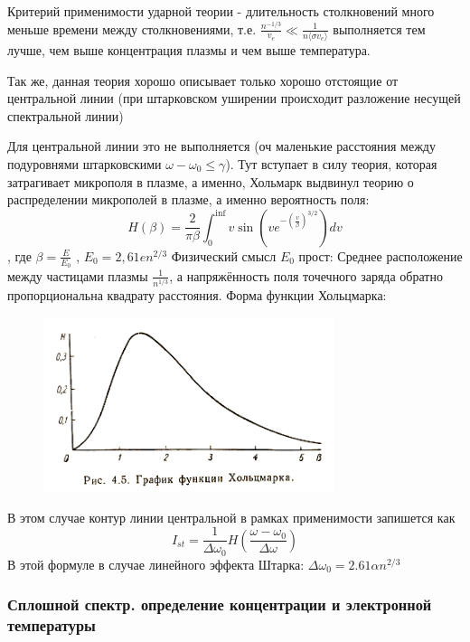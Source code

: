 \documentclass[10pt, a4paper]{article}
\begin{document}
Критерий применимости ударной теории - длительность столкновений много меньше времени между столкновениями, т.е. $\frac{n^{-1/3}}{v_e} \ll \frac{1}{n \langle\sigma v_e\rangle} $ выполняется тем лучше, чем выше концентрация плазмы и чем выше температура.

Так же, данная теория хорошо описывает только хорошо отстоящие от центральной линии (при штарковском уширении происходит разложение несущей спектральной линии)

Для центральной линии это не выполняется (оч маленькие расстояния между подуровнями штарковскими $\omega - \omega_0 \leq \gamma$).
Тут вступает в силу теория, которая затрагивает микрополя в плазме, а именно, Хольмарк выдвинул теорию о распределении микрополей в плазме, а именно вероятность поля:
\begin{equation}
	H( \beta ) = \frac{2}{\pi \beta} \int_{0}^{\inf} v \sin(v e^{- (\frac{v}{\beta})^{3/2}}) dv
\end{equation}
, где $\beta = \frac{E}{E_0}$ , $E_0 = 2,61 e n^{2/3}$ 
Физический смысл $E_0$ прост: Среднее расположение между частицами плазмы $\frac{1}{n^{1/3}} $, а напряжённость поля точечного заряда обратно пропорциональна квадрату расстояния. Форма функции Хольцмарка:
\begin{figure}[ht]
	\begin{center}
		\includegraphics[width=85mm]{Holsmark.JPG}
	\end{center}
\end{figure}

В этом случае контур линии центральной в рамках применимости запишется как 
\begin{equation}
	I_{st}=\frac{1}{\Delta \omega_0} H(\frac{\omega-\omega_0}{\Delta \omega})
\end{equation}
В этой формуле в случае линейного эффекта Штарка: $\Delta \omega_0 = 2.61 \alpha n^{2/3}$

\subsubsection{Сплошной спектр. определение концентрации и электронной температуры}
\end{document}
